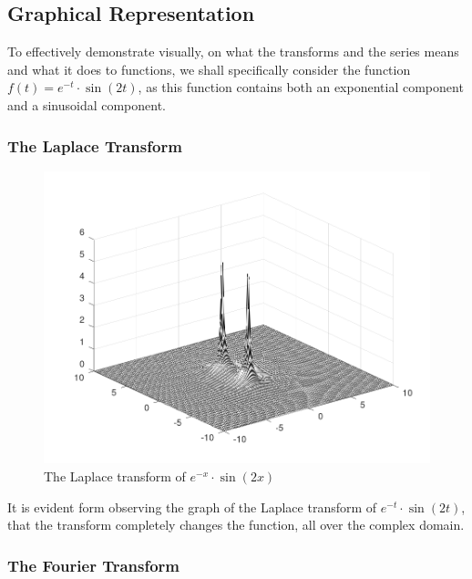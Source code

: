 

\subsection{{Graphical Representation}}

	{To effectively demonstrate visually, on what the transforms and the series means and what it does to functions, we shall specifically consider the function $f(t) = e^{-t}\cdot\sin\left(2t\right)$, as this function contains both an exponential component and a sinusoidal component.}

	\subsubsection{{The Laplace Transform}}


			\begin{figure}[H]
			\centering
			\includegraphics[width=15cm]{LapPictures/bk.png}
    		\caption{{The Laplace transform of $e^{-x}\cdot\sin\left(2x\right)$}}
			\end{figure}

		{It is evident form observing the graph of the Laplace transform of $e^{-t}\cdot\sin\left(2t\right)$, that the transform completely changes the function, all over the complex domain.}

	\subsubsection{{The Fourier Transform}}

